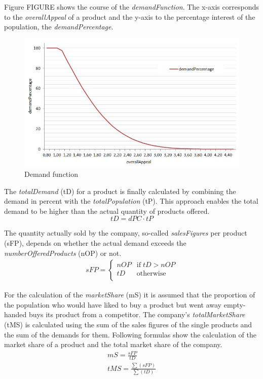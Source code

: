 Figure FIGURE shows the course of the \textit{demandFunction}. The x-axis corresponds to the \textit{overallAppeal} of a product and the y-axis to the percentage interest of the population, the \textit{demandPercentage}. 

\begin{figure}
	\centering
	\includegraphics[width=12cm]{images/demand_function.JPG}
	\caption{Demand function}
	\label{jpg:demand_function}
\end{figure}

The \textit{totalDemand} (\gls{tD}) for a product is finally calculated by combining the demand in percent with the \textit{totalPopulation} (\gls{tP}). This approach enables the total demand to be higher than the actual quantity of products offered.
\begin{equation}
\label{func:totalDemand}
tD = dPC \cdot tP    
\end{equation}

The quantity actually sold by the company, so-called \textit{salesFigures} per product (\gls{sFP}), depends on whether the actual demand exceeds the \textit{numberOfferedProducts} (\gls{nOP}) or not.
\begin{equation}
\label{func:salesFigure}
\begin{aligned}
sFP = 
\begin{cases}
     nOP & \text{if} \; tD > nOP\\
     tD & \text{otherwise} \\
\end{cases}
\end{aligned}
\end{equation}

For the calculation of the \textit{marketShare} (\gls{mS}) it is assumed that the proportion of the population who would have liked to buy a product but went away empty-handed buys its product from a competitor. The company's \textit{totalMarketShare} (\gls{tMS}) is calculated using the sum of the sales figures of the single products and the sum of the demands for them. Following formulas show the calculation of the market share of a product and the total market share of the company.  
\begin{equation}
\label{func:marketShare}
\begin{aligned}
mS = \frac{sFP}{tD} \\
tMS = \frac{\sum(sFP)}{\sum(tD)}  
\end{aligned}
\end{equation}

